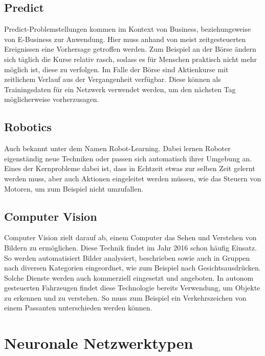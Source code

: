 \subsection{Predict}
\label{subsec:Predict}

Predict-Problemstellungen kommen im Kontext von Business, beziehungsweise von E-Business zur Anwendung. 
Hier muss anhand von meist zeitgesteuerten Ereignissen eine Vorhersage getroffen werden. 
Zum Beispiel an der Börse ändern sich täglich die Kurse relativ rasch, sodass es für Menschen praktisch nicht mehr möglich ist, diese zu verfolgen. 
Im Falle der Börse sind Aktienkurse mit zeitlichem Verlauf aus der Vergangenheit verfügbar. 
Diese können als Trainingsdaten für ein Netzwerk verwendet werden, um den nächsten Tag möglicherweise vorherzusagen. 

\subsection{Robotics}
\label{subsec:Robotics}

Auch bekannt unter dem Namen Robot-Learning. 
Dabei lernen Roboter eigenständig neue Techniken oder passen sich automatisch ihrer Umgebung an. 
Eines der Kernprobleme dabei ist, dass in Echtzeit etwas zur selben Zeit gelernt werden muss, aber auch Aktionen eingeleitet werden müssen, wie das Steuern von Motoren, um zum Beispiel nicht umzufallen.

\subsection{Computer Vision}
\label{subsec:Cumputer Vision}

Computer Vision zielt darauf ab, einem Computer das Sehen und Verstehen von Bildern zu ermöglichen. 
Diese Technik findet im Jahr 2016 schon häufig Einsatz. 
So werden automatisiert Bilder analysiert, beschrieben sowie auch in Gruppen nach diversen Kategorien eingeordnet, wie zum Beispiel nach Gesichtsausdrücken.
Solche Dienste werden auch kommerziell eingesetzt und angeboten. 
In autonom gesteuerten Fahrzeugen findet diese Technologie bereits Verwendung, um Objekte zu erkennen und zu verstehen. 
So muss zum Beispiel ein Verkehrszeichen von einem Passanten unterschieden werden können.

\section{Neuronale Netzwerktypen}

